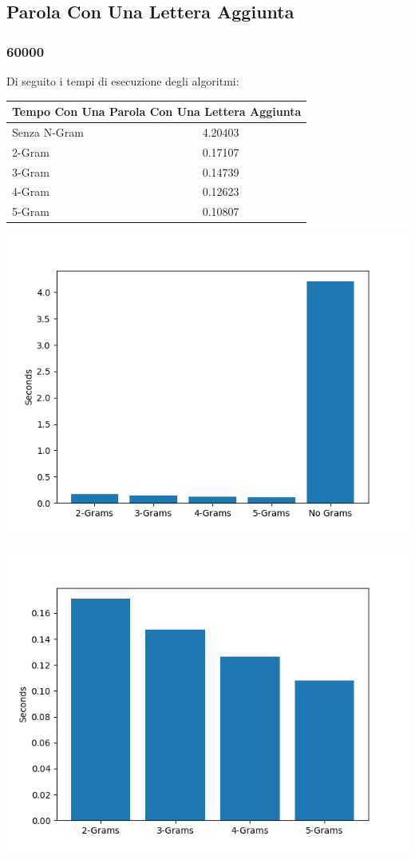 \documentclass{article}
\begin{document}
\subsection{Parola Con Una Lettera Aggiunta}
\subsubsection{60000}
Di seguito i tempi di esecuzione degli algoritmi:
\medskip

\begin{tabular}{ |p{3cm}||p{3.5cm}|  }
 \hline
 \multicolumn{2}{|c|}{Tempo Con Una Parola Con Una Lettera Aggiunta} \\
\hline
 Senza N-Gram  &   4.20403\\\hline
 2-Gram &  0.17107    \\\hline
 3-Gram & 0.14739 \\\hline
 4-Gram & 0.12623\\\hline
 5-Gram & 0.10807  \\
 \hline
\end{tabular}

\includegraphics[scale=0.5]{img/LetteraAggiunta_60000_parole.png}


\includegraphics[scale=0.5]{img/LetteraAggiuntaSoloGram_60000_parole.png}
\end{document}
